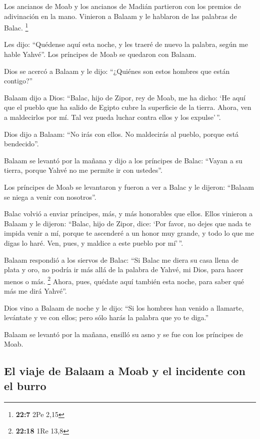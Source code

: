  Los ancianos de Moab y los ancianos de Madián partieron
con los premios de adivinación en la mano. Vinieron a Balaam y le
hablaron de las palabras de Balac. \footnote{\textbf{22:7} 2Pe 2,15}

 Les dijo: ``Quédense aquí esta noche, y les traeré de
nuevo la palabra, según me hable Yahvé''. Los príncipes de Moab se
quedaron con Balaam.

 Dios se acercó a Balaam y le dijo: ``¿Quiénes son estos
hombres que están contigo?''

 Balaam dijo a Dios: ``Balac, hijo de Zipor, rey de Moab,
me ha dicho:  `He aquí que el pueblo que ha salido de
Egipto cubre la superficie de la tierra. Ahora, ven a maldecirlos por
mí. Tal vez pueda luchar contra ellos y los expulse'\,''.

 Dios dijo a Balaam: ``No irás con ellos. No maldecirás
al pueblo, porque está bendecido''.

 Balaam se levantó por la mañana y dijo a los príncipes
de Balac: ``Vayan a su tierra, porque Yahvé no me permite ir con
ustedes''.

 Los príncipes de Moab se levantaron y fueron a ver a
Balac y le dijeron: ``Balaam se niega a venir con nosotros''.

 Balac volvió a enviar príncipes, más, y más honorables
que ellos.  Ellos vinieron a Balaam y le dijeron:
``Balac, hijo de Zipor, dice: `Por favor, no dejes que nada te impida
venir a mí,  porque te ascenderé a un honor muy grande, y
todo lo que me digas lo haré. Ven, pues, y maldice a este pueblo por
mí'\,''.

 Balaam respondió a los siervos de Balac: ``Si Balac me
diera su casa llena de plata y oro, no podría ir más allá de la palabra
de Yahvé, mi Dios, para hacer menos o más. \footnote{\textbf{22:18} 1Re
  13,8}  Ahora, pues, quédate aquí también esta noche,
para saber qué más me dirá Yahvé''.

 Dios vino a Balaam de noche y le dijo: ``Si los hombres
han venido a llamarte, levántate y ve con ellos; pero sólo harás la
palabra que yo te diga.''

 Balaam se levantó por la mañana, ensilló su asno y se
fue con los príncipes de Moab.

\hypertarget{el-viaje-de-balaam-a-moab-y-el-incidente-con-el-burro}{%
\subsection{El viaje de Balaam a Moab y el incidente con el
burro}\label{el-viaje-de-balaam-a-moab-y-el-incidente-con-el-burro}}

